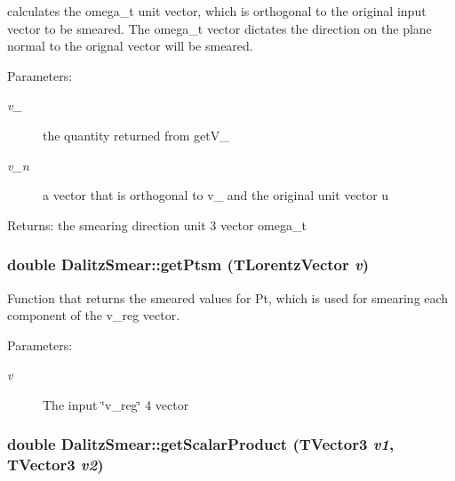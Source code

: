 calculates the omega\_\-t unit vector, which is orthogonal to the original input vector to be smeared. The omega\_\-t vector dictates the direction on the plane normal to the orignal vector will be smeared. 

\begin{Desc}
\item[Parameters:]
\begin{description}
\item[{\em v\_}]the quantity returned from get\-V\_ \item[{\em v\_\-n}]a vector that is orthogonal to v\_ and the original unit vector u \end{description}
\end{Desc}
\begin{Desc}
\item[Returns:]the smearing direction unit 3 vector omega\_\-t \end{Desc}
\subsubsection{\setlength{\rightskip}{0pt plus 5cm}double Dalitz\-Smear::get\-Ptsm (TLorentz\-Vector {\em v})\hspace{0.3cm}{\tt  [private]}}\label{classDalitzSmear_811ae82c27b64f7049a3844148348cc9}


Function that returns the smeared values for Pt, which is used for smearing each component of the v\_\-reg vector. 

\begin{Desc}
\item[Parameters:]
\begin{description}
\item[{\em v}]The input \char`\"{}v\_\-reg\char`\"{} 4 vector \end{description}
\end{Desc}
\subsubsection{\setlength{\rightskip}{0pt plus 5cm}double Dalitz\-Smear::get\-Scalar\-Product (TVector3 {\em v1}, TVector3 {\em v2})\hspace{0.3cm}{\tt  [private]}}\label{classDalitzSmear_dfdb5ad9e4c1397965474088bb01c480}


